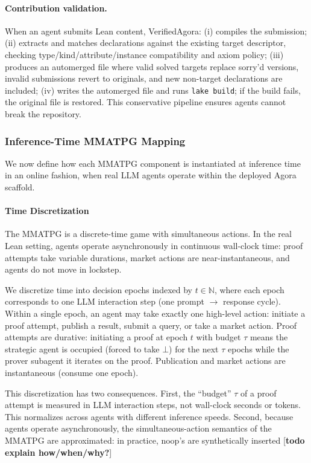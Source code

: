 \paragraph{Contribution validation.}
When an agent submits Lean content, VerifiedAgora: (i) compiles the submission; (ii) extracts and matches declarations against the existing target descriptor, checking type/kind/attribute/instance compatibility and axiom policy; (iii) produces an automerged file where valid solved targets replace sorry'd versions, invalid submissions revert to originals, and new non-target declarations are included; (iv) writes the automerged file and runs \texttt{lake build}; if the build fails, the original file is restored. This conservative pipeline ensures agents cannot break the repository.



\subsubsection{Inference-Time MMATPG Mapping}\label{sec:inference-mapping}

We now define how each MMATPG component is instantiated at inference time in an online fashion, when real LLM agents operate within the deployed Agora scaffold.

\paragraph{Time Discretization}\label{sec:time-discretization}

The MMATPG is a discrete-time game with simultaneous actions. In the real Lean setting, agents operate asynchronously in continuous wall-clock time: proof attempts take variable durations, market actions are near-instantaneous, and agents do not move in lockstep.

We discretize time into decision epochs indexed by $t \in \mathbb{N}$, where each epoch corresponds to one LLM interaction step (one prompt $\to$ response cycle). Within a single epoch, an agent may take exactly one high-level action: initiate a proof attempt, publish a result, submit a query, or take a market action. Proof attempts are durative: initiating a proof at epoch $t$ with budget $\tau$ means the strategic agent is occupied (forced to take $\bot$) for the next $\tau$ epochs while the prover subagent it iterates on the proof. Publication and market actions are instantaneous (consume one epoch).

This discretization has two consequences. First, the ``budget'' $\tau$ of a proof attempt is measured in LLM interaction steps, not wall-clock seconds or tokens. This normalizes across agents with different inference speeds. Second, because agents operate asynchronously, the simultaneous-action semantics of the MMATPG are approximated: in practice, noop's are synthetically inserted [\textbf{todo explain how/when/why?}]

